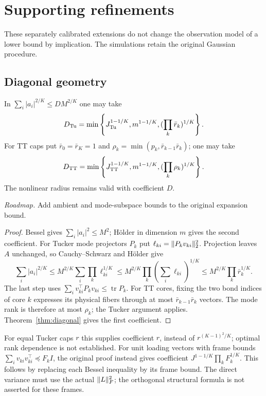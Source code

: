 
\section{Supporting refinements}\label{app:refinements}

These separately calibrated extensions do not change the observation model of a lower bound by implication. The simulations retain the original Gaussian procedure.

\subsection{Diagonal geometry}
\begin{proposition}\label{prop:budget}
In $\sum_i|a_i|^{2/K}\le D M^{2/K}$ one may take
\[
 D_{\mathrm{Tu}}=\min\left\{J_{\mathrm{Tu}}^{1-1/K},m^{1-1/K},
                  (\prod_k\bar r_k)^{1/K}\right\}.
\]
For TT caps put $\bar r_0=\bar r_K=1$ and
$\rho_k=\min(p_k,\bar r_{k-1}\bar r_k)$; one may take
\[
 D_{\mathrm{TT}}=\min\left\{J_{\mathrm{TT}}^{1-1/K},m^{1-1/K},
                  (\prod_k\rho_k)^{1/K}\right\}.
\]
The nonlinear radius remains valid with coefficient $D$.
\end{proposition}
\noindent\emph{Roadmap.} Add ambient and mode-subspace bounds to the original expansion bound.
\begin{proof}
Bessel gives $\sum_i|a_i|^2\le M^2$; H\"older in dimension $m$ gives the second coefficient. For Tucker mode projectors $P_k$ put $\ell_{ki}=\lVert P_kv_{ki}\rVert_2^2$. Projection leaves $A$ unchanged, so Cauchy--Schwarz and H\"older give
\[
 \sum_i|a_i|^{2/K}
 \le M^{2/K}\sum_i\prod_k\ell_{ki}^{1/K}
 \le M^{2/K}\prod_k(\sum_i\ell_{ki})^{1/K}
 \le M^{2/K}\prod_k\bar r_k^{1/K}.
\]
The last step uses $\sum_i v_{ki}^\top P_kv_{ki}\le\operatorname{tr}P_k$.
For TT cores, fixing the two bond indices of core $k$ expresses its physical fibers through at most $\bar r_{k-1}\bar r_k$ vectors. The mode rank is therefore at most $\rho_k$; the Tucker argument applies. Theorem~\ref{thm:diagonal} gives the first coefficient.
\end{proof}
For equal Tucker caps $r$ this supplies coefficient $r$, instead of $r^{(K-1)^2/K}$; optimal rank dependence is not established.
For unit loading vectors with frame bounds $\sum_i v_{ki}v_{ki}^\top\preceq F_kI$, the original proof instead gives coefficient $J^{1-1/K}\prod_kF_k^{1/K}$. This follows by replacing each Bessel inequality by its frame bound. The direct variance must use the actual $\lVert L\rVert_F^2$; the orthogonal structural formula is not asserted for these frames.

